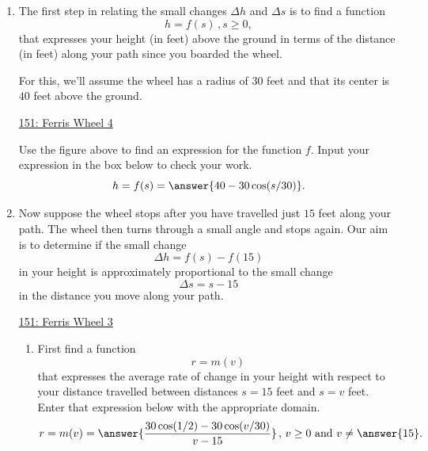 \documentclass{ximera}
\begin{document}
\begin{question}
\begin{enumerate}
Then drag the slider $k$ in Line 4 and again the slider $n$ in Line 3 to make $\Delta s$ closer to $0$. Summarize your observations about how the ratio $\Delta h/\Delta s$ changes as $\Delta s \to 0$. 

\begin{freeResponse}
\end{freeResponse}


\item The first step in relating the small changes $\Delta h$ and $\Delta s$ is to find a function
\[
      h = f(s) \, , s\geq 0,
\]
that expresses your height (in feet) above the ground in terms of the distance (in feet) along your path since you boarded the wheel. 

For this, we'll assume the wheel has a radius of $30$ feet and that its center is $40$ feet above the ground.

\begin{onlineOnly}
    \begin{center}
\end{center}
\end{onlineOnly}

\href{https://www.desmos.com/calculator/q6wnvqhnpg}{151: Ferris Wheel 4}

Use the figure above to find an expression for the function $f$. Input your expression in the box below to check your work.
\[
    h  = f(s)  = \answer{40-30\cos(s/30)} .
\]

\item Now suppose the wheel stops after you have travelled just $15$ feet along your path. The wheel then turns through a small angle and stops again. Our aim is to determine if the small change
\[
       \Delta h = f(s) - f(15)
\] 
in your height is approximately proportional to the small change
\[
  \Delta s = s - 15
\]
in the distance you move along your path.

\begin{onlineOnly}
    \begin{center}
\end{center}
\end{onlineOnly}

\href{https://www.desmos.com/calculator/uolmkpi5yr}{151: Ferris Wheel 3}

\begin{enumerate}
\item First find a function 
\[
   r = m(v)
\]
that expresses the average rate of change in your height with respect to your distance travelled between distances $s=15$ feet and $s=v$ feet. Enter that expression below with the appropriate domain.
\[
  r = m(v) = \answer{\frac{30\cos(1/2) - 30\cos(v/30)}{v-15}} \, , \,  v \geq 0 \text{ and } v\neq \answer{15}.
\]


\end{enumerate}
\end{enumerate}
\end{question}
\end{document}

